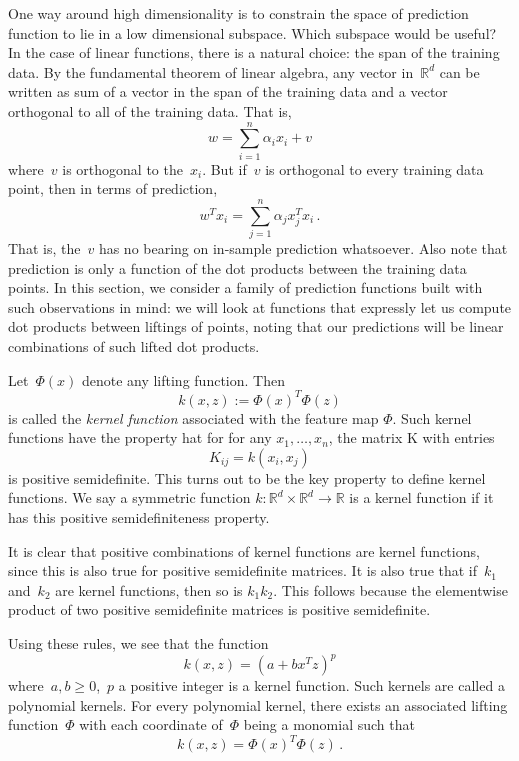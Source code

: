 \documentclass{tufte-book}
\begin{document}

One way around high dimensionality is to constrain the space of
prediction function to lie in a low dimensional subspace. Which subspace
would be useful? In the case of linear functions, there is a natural
choice: the span of the training data. By the fundamental theorem of
linear algebra, any vector in~\(\mathbb{R}^d\) can be written as sum of
a vector in the span of the training data and a vector orthogonal to all
of the training data. That is, \[
    w = \sum_{i=1}^n \alpha_i x_i + v
\] where~\(v\) is orthogonal to the~\(x_i\). But if~\(v\) is orthogonal
to every training data point, then in terms of prediction, \[
    w^T x_i = \sum_{j=1}^n \alpha_j x_j^T x_i \,.
\] That is, the~\(v\) has no bearing on in-sample prediction whatsoever.
Also note that prediction is only a function of the dot products between
the training data points. In this section, we consider a family of
prediction functions built with such observations in mind: we will look
at functions that expressly let us compute dot products between liftings
of points, noting that our predictions will be linear combinations of
such lifted dot products.

Let~\(\Phi(x)\) denote any lifting function. Then \[
    k(x,z) := \Phi(x)^T \Phi(z)
\] is called the \emph{kernel function} associated with the feature map
\(\Phi\). Such kernel functions have the property hat for for any
\(x_1,\ldots, x_n\), the matrix K with entries \[
    K_{ij} = k(x_i,x_j)
\] is positive semidefinite. This turns out to be the key property to
define kernel functions. We say a symmetric function
\(k:\mathbb{R}^d \times \mathbb{R}^d \rightarrow \mathbb{R}\) is a
kernel function if it has this positive semidefiniteness property.

It is clear that positive combinations of kernel functions are kernel
functions, since this is also true for positive semidefinite matrices.
It is also true that if~\(k_1\) and~\(k_2\) are kernel functions, then
so is \(k_1 k_2\). This follows because the elementwise product of two
positive semidefinite matrices is positive semidefinite.

Using these rules, we see that the function \[
    k(x,z) = (a +b x^Tz)^p
\] where~\(a,b\geq 0\),~\(p\) a positive integer is a kernel function.
Such kernels are called a polynomial kernels. For every polynomial
kernel, there exists an associated lifting function~\(\Phi\) with each
coordinate of~\(\Phi\) being a monomial such that \[
    k(x,z) =\Phi(x)^T \Phi(z) \,.
\]
\end{document}
